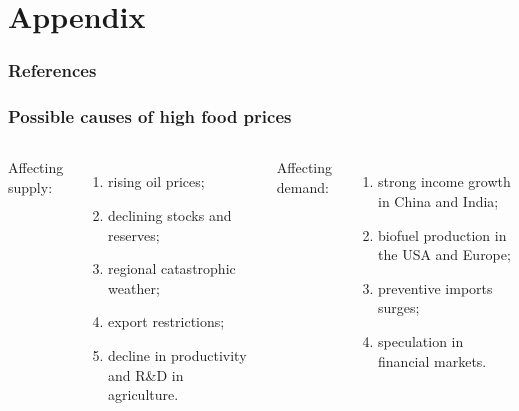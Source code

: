 \documentclass[svgnames]{beamer}
\begin{document}
\beginbackup
\section*{Appendix}

\begin{frame}[fragile]
\frametitle{References}
\printbibliography
\end{frame}


\begin{frame}[label=frame-causes-crisis]
\frametitle{Possible causes of high food prices}
\begin{columns}
Affecting supply:
\begin{enumerate}
  \item rising oil prices;
  \item declining stocks and reserves;
  \item regional catastrophic weather;
  \item export restrictions;
  \item decline in productivity and R\&D in agriculture.
\end{enumerate}


Affecting demand:
\begin{enumerate}
  \item strong income growth in China and India;
  \item biofuel production in the USA and Europe;
  \item preventive imports surges;
  \item speculation in financial markets.
\end{enumerate}
\end{columns}
\end{frame}
\end{document}
